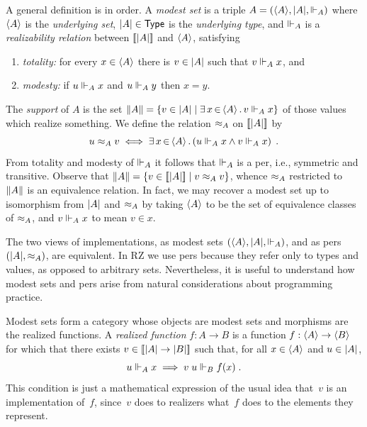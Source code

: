 A general definition is in order. A \emph{modest set} is a triple $A =
(\langle A \rangle, |A|, {\Vdash_A})$ where $\langle A \rangle$ is the
\emph{underlying set}, $|A| \in \mathsf{Type}$ is the \emph{underlying
  type}, and $\Vdash_A$ is a \emph{realizability relation} between
$[\![|A|]\!]$ and $\langle A \rangle$, satisfying
% 
\begin{enumerate}
\item \emph{totality:} for every $x \in \langle A \rangle$ there is $v \in
  |A|$ such that $v \Vdash_A x$, and
\item \emph{modesty:} if $u \Vdash_A x$ and $u \Vdash_A y$ then $x = y$.
\end{enumerate}
%
The \emph{support} of $A$ is the set $\|A\| = \{v \in
  |A| \mid \exists\, x \,{\in}\, \langle A \rangle\,.\,v \Vdash_A x\}$ of those values
which realize something. We define the relation $\approx_A$ on
$[\![|A|]\!]$ by
%
\begin{equation*}
  u \approx_A v
  \iff
  \exists\, x \,{\in}\, \langle A \rangle\,.\left(u \Vdash_A x \land v \Vdash_A x\right) \;.
\end{equation*}
%
From totality and modesty of $\Vdash_A$ it follows that $\Vdash_A$ is a per,
i.e., symmetric and transitive. Observe that $\|A\| = \{v \in
  [\![|A|]\!] \mid v \approx_A v\}$, whence $\approx_A$
restricted to $\|A\|$ is an equivalence relation. In fact, we
may recover a modest set up to isomorphism from $|A|$ and
$\approx_A$ by taking $\langle A \rangle$ to be the set of equivalence classes of
$\approx_A$, and $v \Vdash_A x$ to mean $v \in x$.

The two views of implementations, as modest sets $(\langle A \rangle,
|A|, {\Vdash_A})$, and as pers $(|A|, {\approx_A})$, are
equivalent. In RZ we use pers because they refer only to types and
values, as opposed to arbitrary sets. Nevertheless, it is useful to
understand how modest sets and pers arise from natural considerations
about programming practice.

Modest sets form a category whose objects are modest sets and
morphisms are the realized functions. A \emph{realized function} $f :
A \to B$ is a function $f : \langle A \rangle \to \langle B \rangle$ for which that there
exists $v \in [\![|A| \to |B|]\!]$ such that, for all
$x \in \langle A \rangle$ and $u \in |A|$,
%
\begin{equation}
  \label{eq:rz-function-space}
  u \Vdash_A x \implies v\;u \Vdash_B f(x) \;.
\end{equation}
%
This condition is just a mathematical expression of the usual idea
that~$v$ is an implementation of~$f$, since~$v$ does to realizers
what~$f$ does to the elements they represent.


